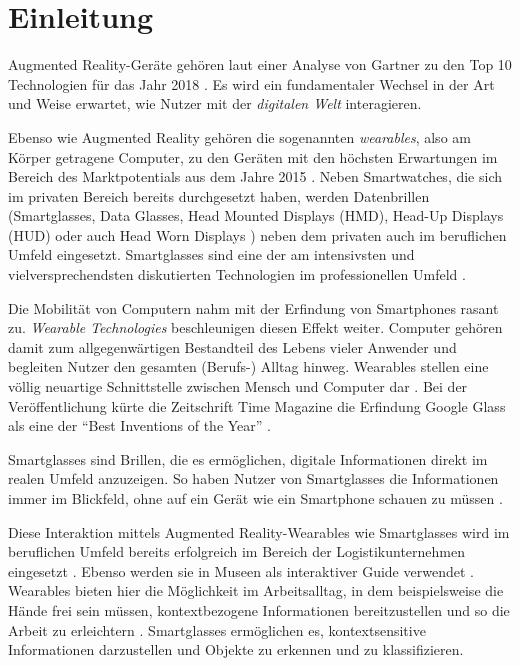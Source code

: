 %
%
%
%
%
%
\chapter{Einleitung}
\label{ch:Einleitung}
Augmented Reality-Geräte gehören laut einer Analyse von Gartner \cite{Linden2003} zu den Top 10 Technologien für das Jahr 2018 \cite{Panetta2017a}. Es wird ein fundamentaler Wechsel in der Art und Weise erwartet, wie Nutzer mit der \emph{digitalen Welt} interagieren. 

Ebenso wie Augmented Reality gehören die sogenannten \emph{wearables}, also am Körper getragene Computer, zu den Geräten mit den höchsten Erwartungen im Bereich des Marktpotentials aus dem Jahre 2015 \cite{Levy2015}. Neben Smartwatches, die sich im privaten Bereich bereits durchgesetzt haben, werden Datenbrillen (Smartglasses, Data Glasses, Head Mounted Displays (HMD), Head-Up Displays (HUD) oder auch Head Worn Displays \cite{Zobel2016}) neben dem privaten auch im beruflichen Umfeld eingesetzt. Smartglasses sind eine der am intensivsten und vielversprechendsten diskutierten Technologien im professionellen Umfeld \cite{Hein2016}.

Die Mobilität von Computern nahm mit der Erfindung von Smartphones rasant zu. \emph{Wearable Technologies} beschleunigen diesen Effekt weiter. Computer gehören damit zum allgegenwärtigen Bestandteil des Lebens vieler Anwender und begleiten Nutzer den gesamten (Berufs-) Alltag hinweg. Wearables stellen eine völlig neuartige Schnittstelle zwischen Mensch und Computer dar \cite[S.~25f]{Schwenke2016}. Bei der Veröffentlichung kürte die Zeitschrift Time Magazine die Erfindung Google Glass als eine der \enquote{Best Inventions of the Year} \cite{Bilton2015}.

Smartglasses sind Brillen, die es ermöglichen, digitale Informationen direkt im realen Umfeld anzuzeigen. So haben Nutzer von Smartglasses die Informationen immer im Blickfeld, ohne auf ein Gerät wie ein Smartphone schauen zu müssen \cite{Due2014Glasses}.

Diese Interaktion mittels Augmented Reality-Wearables wie Smartglasses wird im beruflichen Umfeld bereits erfolgreich im Bereich der Logistikunternehmen eingesetzt \cite{Plutz}.
Ebenso werden sie in Museen als interaktiver Guide verwendet \cite{Hein2016}. 
Wearables bieten hier die Möglichkeit im Arbeitsalltag, in dem beispielsweise die Hände frei sein müssen, kontextbezogene Informationen bereitzustellen und so die Arbeit zu erleichtern \cite{Zobel2016}. Smartglasses ermöglichen es, kontextsensitive Informationen darzustellen und Objekte zu erkennen und zu klassifizieren.
%


